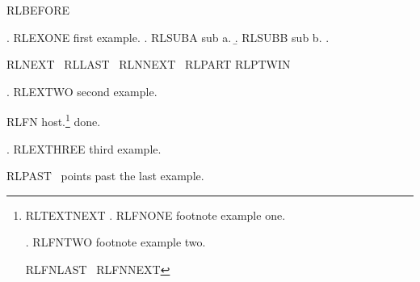 
\usepackage{hyperref}

RLBEFORE \LLast\ \Last\ \Next

\ex.\label{rl:one} RLEXONE first example.
\a. RLSUBA sub a.
\b. RLSUBB sub b.
\z.

RLNEXT \Next\ RLLAST \Last\ RLNNEXT \NNext\ RLPART \Next[b]
RLPTWIN \pNext

\ex. RLEXTWO second example.

RLFN host.\footnote{RLTEXTNEXT \TextNext
\ex. RLFNONE footnote example one.

\ex. RLFNTWO footnote example two.

RLFNLAST \Last\ RLFNNEXT \Next} done.

\ex. RLEXTHREE third example.

RLPAST \Next\ points past the last example.

